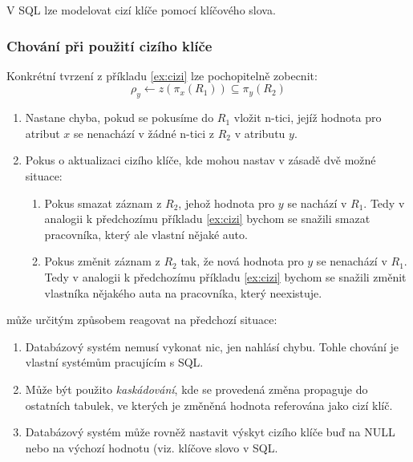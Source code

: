 V SQL lze modelovat cizí klíče pomocí klíčového slova.

\subsubsection{Chování při použití cizího klíče}
Konkrétní tvrzení z příkladu \ref{ex:cizi} lze pochopitelně zobecnit:
$$
\rho_{y} \leftarrow z(\pi_{x} \left( R_{1} \right) ) \subseteq \pi_{y} \left( R_{2} \right)
$$
\begin{enumerate}
\item Nastane chyba, pokud se pokusíme do $R_{1}$ vložit n-tici, jejíž hodnota pro atribut $x$  se nenachází v žádné n-tici z $R_{2}$ v atributu $y$.
\item Pokus o aktualizaci cizího klíče, kde mohou nastav v zásadě dvě možné situace:
\begin{enumerate}
\item Pokus smazat záznam z $R_{2}$, jehož hodnota pro $y$ se nachází v $R_{1}$. Tedy v analogii k předchozímu příkladu \ref{ex:cizi} bychom se snažili smazat pracovníka, který ale vlastní nějaké auto.
\item Pokus změnit záznam z $R_{2}$ tak, že nová hodnota pro $y$ se nenachází v $R_{1}$. Tedy v analogii k předchozímu příkladu \ref{ex:cizi} bychom se snažili změnit vlastníka nějakého auta na pracovníka, který neexistuje.
\end{enumerate}
\end{enumerate}

 může určitým způsobem reagovat na předchozí situace:
\begin{enumerate}
\item Databázový systém nemusí vykonat nic, jen nahlásí chybu. Tohle chování je vlastní systémům pracujícím s SQL.
\item Může být použito \textit{kaskádování}, kde se provedená změna propaguje do ostatních tabulek, ve kterých je změněná hodnota referována jako cizí klíč.
\item Databázový systém může rovněž nastavit výskyt cizího klíče buď na NULL nebo na výchozí hodnotu (viz. klíčove slovo v SQL.
\end{enumerate}


